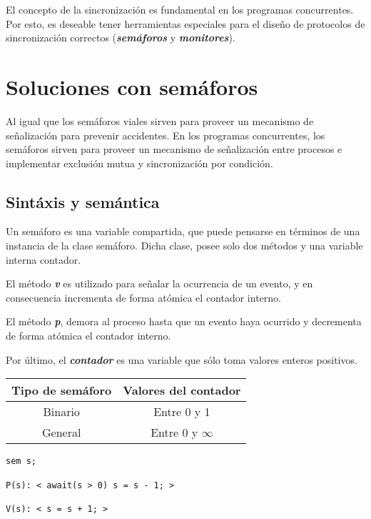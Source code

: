 \documentclass[a4paper, 10pt, margin=0in]{report}
\begin{document}
El concepto de la sincronización es fundamental en los programas concurrentes. Por esto, es deseable tener herramientas especiales para el diseño de protocolos de sincronización correctos (\textbf{\emph{semáforos}} y \textbf{\emph{monitores}}).

\chapter{Soluciones con semáforos}
\vspace*{-10mm}

Al igual que los semáforos viales sirven para proveer un mecanismo de señalización para prevenir accidentes. En los programas concurrentes, los semáforos sirven para proveer un mecanismo de señalización entre procesos e implementar exclusión mutua y sincronización por condición.

\section{Sintáxis y semántica}

Un semáforo es una variable compartida, que puede pensarse en términos de una instancia de la clase semáforo. Dicha clase, posee solo dos métodos y una variable interna contador. 

El método \textbf{\emph{v}} es utilizado para señalar la ocurrencia de un evento, y en consecuencia incrementa de forma atómica el contador interno.

El método \textbf{\emph{p}}, demora al proceso hasta que un evento haya ocurrido y decrementa de forma atómica el contador interno.

Por último, el \textbf{\emph{contador}} es una variable que sólo toma valores enteros positivos.



\begin{multicols}{2}

    {\renewcommand{\arraystretch}{2}%
    \centering
    \begin{tabular}{cc}
        \textbf{Tipo de semáforo} & \textbf{Valores del contador}\\
        \hline 
        Binario & Entre 0 y 1\\ 
        General & Entre 0 y $\infty$\\ 
    \end{tabular}}

\begin{lstlisting}
sem s;

P(s): < await(s > 0) s = s - 1; >

V(s): < s = s + 1; >
\end{lstlisting}

\columnbreak


    
\end{multicols}
\end{document}
